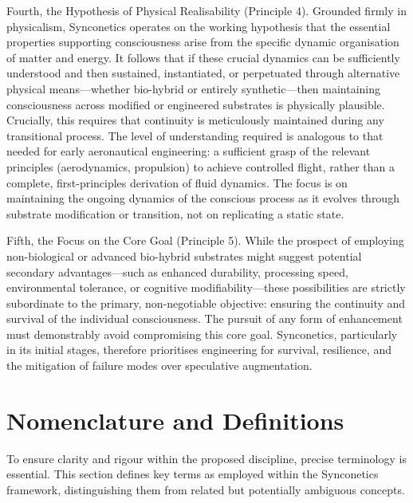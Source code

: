 \documentclass[10pt]{article}
\begin{document}
\begin{sloppypar}
  Fourth, the Hypothesis of Physical Realisability (Principle 4). Grounded firmly in physicalism, Synconetics operates on the working hypothesis that the essential properties supporting consciousness arise from the specific dynamic organisation of matter and energy. It follows that if these crucial dynamics can be sufficiently understood and then sustained, instantiated, or perpetuated through alternative physical means—whether bio-hybrid or entirely synthetic—then maintaining consciousness across modified or engineered substrates is physically plausible. Crucially, this requires that continuity is meticulously maintained during any transitional process. The level of understanding required is analogous to that needed for early aeronautical engineering: a sufficient grasp of the relevant principles (aerodynamics, propulsion) to achieve controlled flight, rather than a complete, first-principles derivation of fluid dynamics. The focus is on maintaining the ongoing dynamics of the conscious process as it evolves through substrate modification or transition, not on replicating a static state.

  Fifth, the Focus on the Core Goal (Principle 5). While the prospect of employing non-biological or advanced bio-hybrid substrates might suggest potential secondary advantages—such as enhanced durability, processing speed, environmental tolerance, or cognitive modifiability—these possibilities are strictly subordinate to the primary, non-negotiable objective: ensuring the continuity and survival of the individual consciousness. The pursuit of any form of enhancement must demonstrably avoid compromising this core goal. Synconetics, particularly in its initial stages, therefore prioritises engineering for survival, resilience, and the mitigation of failure modes over speculative augmentation.

  \section{Nomenclature and Definitions}
  \label{sec:nomenclature}

  To ensure clarity and rigour within the proposed discipline, precise terminology is essential. This section defines key terms as employed within the Synconetics framework, distinguishing them from related but potentially ambiguous concepts.


\end{sloppypar}
\end{document}

